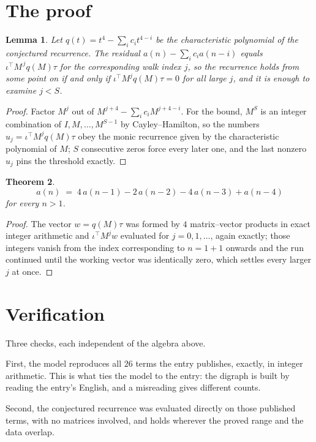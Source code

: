 \documentclass[11pt,a4paper]{article}
\theoremstyle{plain}
\newtheorem{theorem}{Theorem}
\newtheorem{lemma}[theorem]{Lemma}
\theoremstyle{definition}
\begin{document}
\section{The proof}

\begin{lemma}\label{lem:crit}
Let $q(t)=t^{4}-\sum_i c_it^{4-i}$ be the characteristic polynomial of the
conjectured recurrence. The residual $a(n)-\sum_ic_ia(n-i)$ equals
$\iota^{\!\top}M^{\,j}q(M)\tau$ for the corresponding walk index $j$, so the recurrence
holds from some point on if and only if $\iota^{\!\top}M^{j}q(M)\tau=0$ for all large $j$,
and it is enough to examine $j<S$.
\end{lemma}

\begin{proof}
Factor $M^{j}$ out of $M^{j+4}-\sum_ic_iM^{j+4-i}$. For the bound, $M^{S}$
is an integer combination of $I,M,\dots,M^{S-1}$ by Cayley--Hamilton, so the numbers
$u_j=\iota^{\!\top}M^{j}q(M)\tau$ obey the monic recurrence given by the characteristic
polynomial of $M$; $S$ consecutive zeros force every later one, and the last nonzero $u_j$
pins the threshold exactly.
\end{proof}

\begin{theorem}
\[
a(n)\;=\;4\,a(n-1) - 2\,a(n-2) - 4\,a(n-3) + a(n-4)
\]
for every $n>1$.
\end{theorem}

\begin{proof}
The vector $w=q(M)\tau$ was formed by $4$ matrix--vector products in exact integer
arithmetic and $\iota^{\!\top}M^{j}w$ evaluated for $j=0,1,\dots$, again exactly; those
integers vanish from the index corresponding to $n=1+1$ onwards and the run continued
until the working vector was identically zero, which settles every larger $j$ at once.
\end{proof}

\section{Verification}

Three checks, each independent of the algebra above.

First, the model reproduces all $26$ terms the entry publishes, exactly, in integer
arithmetic. This is what ties the model to the entry: the digraph is built by reading the
entry's English, and a misreading gives different counts.

Second, the conjectured recurrence was evaluated directly on those published terms, with no
matrices involved, and holds wherever the proved range and the data overlap.
\end{document}
